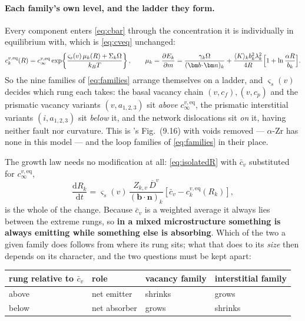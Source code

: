 \documentclass{article}
\newcommand{\bvec}{\bm b}
\newcommand{\nvec}{\bm n}
\begin{document}
\paragraph{Each family's own level, and the ladder they form.} Every component
enters \cref{eq:cbar} through the concentration it is individually in equilibrium
with, which is \cref{eq:cveq} unchanged:
\begin{equation}
  c^{v,\mathrm{eq}}_{k}(R)
  =c^{v,\mathrm{eq}}_\infty
   \exp\!\left\{\frac{\varsigma_s(v)\,\mu_k(R)+\Sigma_k\Omega}{k_BT}\right\},
  \qquad
  \mu_k=\frac{\partial E_k}{\partial m}
       =\frac{\gamma_k\Omega}{(\bvec\!\cdot\!\nvec)_k}
        +\frac{\langle K\rangle_k b_k^2\lambda_k^2}{4R}
         \Bigl[1+\ln\frac{\alpha R}{b_k}\Bigr].
  \label{eq:levels}
\end{equation}
So the nine families of \cref{eq:families} arrange themselves on a ladder, and
$\varsigma_s(v)$ decides which rung each takes: the basal vacancy chain
$(v,c_f),(v,c_p)$ and the prismatic vacancy variants $(v,a_{1,2,3})$ sit
\emph{above} $c^{v,\mathrm{eq}}_\infty$, the prismatic interstitial variants
$(i,a_{1,2,3})$ sit \emph{below} it, and the network dislocations sit
\emph{on} it, having neither fault nor curvature. This is
\citeauthor{ghoniem_thesis}'s Fig.~(9.16) with voids removed --- $\alpha$-Zr has
none in this model --- and the loop families of \cref{eq:families} in their place.

The growth law needs no modification at all: \cref{eq:isolatedR} with $\bar c_v$
substituted for $c^{v,\mathrm{eq}}_\infty$,
\begin{equation}
  \frac{\mathrm dR_k}{\mathrm dt}
   =\varsigma_s(v)\,\frac{Z_{k,v}\,\overline D^{v}}
                         {(\bvec\!\cdot\!\nvec)_k}
    \left[\bar c_v-c^{v,\mathrm{eq}}_{k}(R_k)\right],
  \label{eq:popR}
\end{equation}
is the whole of the change. Because $\bar c_v$ is a weighted average it always
lies between the extreme rungs, so \textbf{in a mixed microstructure something is
always emitting while something else is absorbing}. Which of the two a given
family does follows from where its rung sits; what that does to its \emph{size}
then depends on its character, and the two questions must be kept apart:

\begin{center}\small
\begin{tabular}{@{}llll@{}}
\toprule
rung relative to $\bar c_v$ & role & vacancy family & interstitial family\\
\midrule
above & net emitter  & shrinks & grows\\
below & net absorber & grows   & shrinks\\
\bottomrule
\end{tabular}
\end{center}
\end{document}
